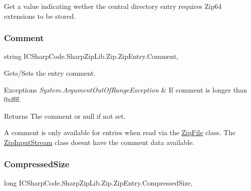 Get a value indicating wether the central directory entry requires Zip64 extensions to be stored. 

\mbox{\label{class_i_c_sharp_code_1_1_sharp_zip_lib_1_1_zip_1_1_zip_entry_acb0c7ec544761897d40ab8eec2fbc393}} 
\subsubsection{\texorpdfstring{Comment}{Comment}}
{\footnotesize\ttfamily string I\+C\+Sharp\+Code.\+Sharp\+Zip\+Lib.\+Zip.\+Zip\+Entry.\+Comment\hspace{0.3cm}{\ttfamily [get]}, {\ttfamily [set]}}



Gets/\+Sets the entry comment. 


\begin{DoxyExceptions}{Exceptions}
{\em System.\+Argument\+Out\+Of\+Range\+Exception} & If comment is longer than 0xffff. \\
\hline
\end{DoxyExceptions}
\begin{DoxyReturn}{Returns}
The comment or null if not set. 
\end{DoxyReturn}


A comment is only available for entries when read via the \hyperlink{class_i_c_sharp_code_1_1_sharp_zip_lib_1_1_zip_1_1_zip_file}{Zip\+File} class. The \hyperlink{class_i_c_sharp_code_1_1_sharp_zip_lib_1_1_zip_1_1_zip_input_stream}{Zip\+Input\+Stream} class doesnt have the comment data available. \mbox{\label{class_i_c_sharp_code_1_1_sharp_zip_lib_1_1_zip_1_1_zip_entry_a5bfff25f9a289baca533f5f6c194e1ca}} 
\subsubsection{\texorpdfstring{Compressed\+Size}{CompressedSize}}
{\footnotesize\ttfamily long I\+C\+Sharp\+Code.\+Sharp\+Zip\+Lib.\+Zip.\+Zip\+Entry.\+Compressed\+Size\hspace{0.3cm}{\ttfamily [get]}, {\ttfamily [set]}}



